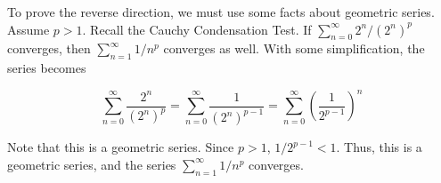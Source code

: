 \documentclass{article}
\begin{document}
To prove the reverse direction, we must use some facts about geometric series. Assume $p > 1$. Recall the Cauchy Condensation Test. If $\sum_{n=0}^{\infty} 2^n/(2^n)^p$ converges, then $\sum_{n=1}^{\infty} 1/n^p$ converges as well. With some simplification, the series becomes

\begin{equation}
    \sum_{n=0}^{\infty} \frac{2^n}{(2^n)^p} = \sum_{n=0}^{\infty} \frac{1}{(2^n)^{p-1}} = \sum_{n=0}^{\infty} (\frac{1}{2^{p-1}})^n
\end{equation}

Note that this is a geometric series. Since $p > 1$, $1/2^{p-1} < 1$. Thus, this is a geometric series, and the series $\sum_{n=1}^{\infty} 1/n^p$ converges. 
\end{document}
